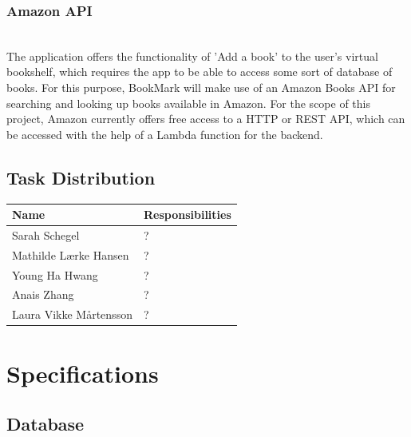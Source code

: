 \documentclass[conference]{IEEEtran}
\begin{document}
\subsubsection{Amazon API}\hfill\\

The application offers the functionality of 'Add a book' to the user's virtual bookshelf, which requires the app to be able to access some sort of database of books. For this purpose, BookMark will make use of an Amazon Books API for searching and looking up books available in Amazon. For the scope of this project, Amazon currently offers free access to a HTTP or REST API, which can be accessed with the help of a Lambda function for the backend. \\
  

\subsection{Task Distribution}
\hfill


\begin{center}
\begin{tabular}{ | m{3.5cm} | m{4.1cm}| } 

\hline
Name & Responsibilities \\
 \hline
 Sarah Schegel  & ? \\
 \hline
 Mathilde Lærke Hansen & ? \\
 \hline
 Young Ha Hwang & ? \\
 \hline
 Anais Zhang & ? \\
 \hline
 Laura Vikke Mårtensson & ? \\
 \hline
 
\end{tabular}
\end{center}

\section{Specifications}

\subsection{Database}
\end{document}

